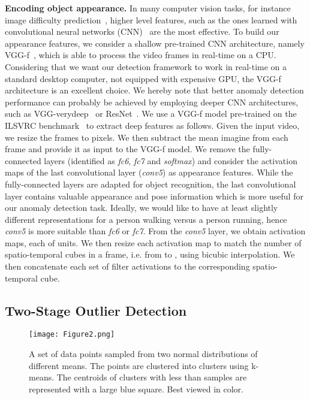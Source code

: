 \documentclass[10pt,twocolumn,letterpaper]{article}
\begin{document}
\noindent
{\bf Encoding object appearance.}
In many computer vision tasks, for instance image difficulty prediction~\cite{img-difficulty-CVPR-2016}, 
higher level features, such as the ones learned with convolutional neural networks (CNN)~\cite{Hinton-NIPS-2012} are the most effective. To build our appearance features, we consider a shallow pre-trained CNN architecture, namely VGG-f~\cite{Chatfield-BMVC-14}, which is able to process the video frames in real-time on a CPU. Considering that we want our detection framework to work in real-time on a standard desktop computer, not equipped with expensive GPU, the VGG-f architecture is an excellent choice.
We hereby note that better anomaly detection performance can probably be achieved by employing deeper CNN architectures, such as VGG-verydeep~\cite{Simonyan-ICLR-14} or ResNet~\cite{He-CVPR-2016}.
We use a VGG-f model pre-trained on the ILSVRC benchmark~\cite{Russakovsky2015} to extract deep features as follows. Given the input video, we resize the frames to  pixels. We then subtract the mean imagine from each frame and provide it as input to the VGG-f model. We remove the fully-connected layers (identified as \emph{fc6}, \emph{fc7} and \emph{softmax}) and consider the activation maps of the last convolutional layer (\emph{conv5}) as appearance features. While the fully-connected layers are adapted for object recognition, the last convolutional layer contains valuable appearance and pose information which is more useful for our anomaly detection task. Ideally, we would like to have at least slightly different representations for a person walking versus a person running, hence \emph{conv5} is more suitable than \emph{fc6} or \emph{fc7}. From the \emph{conv5} layer, we obtain  activation maps, each of  units. We then resize each activation map to match the number of spatio-temporal cubes in a frame, i.e. from  to , using bicubic interpolation. We then concatenate each set of  filter activations to the corresponding spatio-temporal cube. 

\vspace*{-0.1cm}
\subsection{Two-Stage Outlier Detection}
\vspace*{-0.1cm}

\begin{figure}[!t]
\begin{center}
\texttt{[image: Figure2.png]}
\end{center}
\vspace*{-0.2cm}
\caption{A set of  data points sampled from two normal distributions of different means. The points are clustered into  clusters using k-means. The centroids of clusters with less than  samples are represented with a large blue square. Best viewed in color.}
\label{fig_kmeans}
\vspace*{-0.4cm}
\end{figure}
\end{document}

